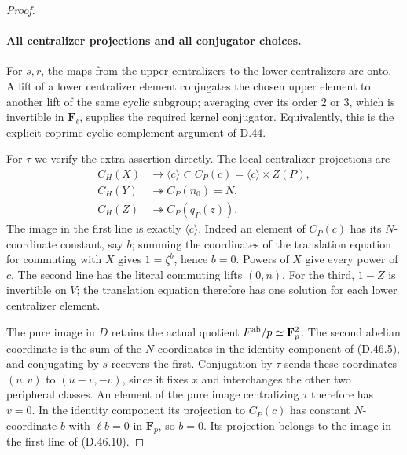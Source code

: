 \begin{proof}
\paragraph{All centralizer projections and all conjugator choices.}
For \(s,r\), the maps from the upper centralizers to the
lower centralizers are onto. A lift of a lower centralizer
element conjugates the chosen upper element to another
lift of the same cyclic subgroup; averaging over its order
\(2\) or \(3\), which is invertible in
\(\mathbf F_\ell\), supplies the required kernel
conjugator. Equivalently, this is the explicit coprime
cyclic-complement argument of D.44.

For \(\tau\) we verify the extra assertion directly.
The local centralizer projections are
\[
 \begin{split}
 C_H(X)&\longrightarrow\langle c\rangle
                    \subset C_P(c)=\langle c\rangle\times Z(P),\\
 C_H(Y)&\twoheadrightarrow C_P(n_0)=N,\\
 C_H(Z)&\twoheadrightarrow C_P(q_P(z)).
 \end{split}
 \tag{D.46.10}
\]
The image in the first line is exactly \(\langle c\rangle\).
Indeed an element of \(C_P(c)\) has its \(N\)-coordinate
constant, say \(b\); summing the coordinates of the
translation equation for commuting with \(X\) gives
\(1=\zeta^b\), hence \(b=0\). Powers of \(X\)
give every power of \(c\). The second line has the
literal commuting lifts \((0,n)\). For the third,
\(1-Z\) is invertible on \(V\); the translation
equation therefore has one solution for each lower
centralizer element.

The pure image in \(D\) retains the actual quotient
\(F^{\rm ab}/p\simeq\mathbf F_p^2\).
The second abelian coordinate is the sum of the
\(N\)-coordinates in the identity component of
\textup{(D.46.5)}, and conjugating by \(s\) recovers
the first. Conjugation by \(\tau\) sends these coordinates
\((u,v)\) to \((u-v,-v)\), since it fixes \(x\)
and interchanges the other two peripheral classes.
An element of the pure image centralizing \(\tau\)
therefore has \(v=0\). In the identity component its
projection to \(C_P(c)\) has constant \(N\)-coordinate
\(b\) with \(\ell b=0\) in \(\mathbf F_p\), so
\(b=0\). Its projection belongs to the image in the
first line of \textup{(D.46.10)}.


\end{proof}
